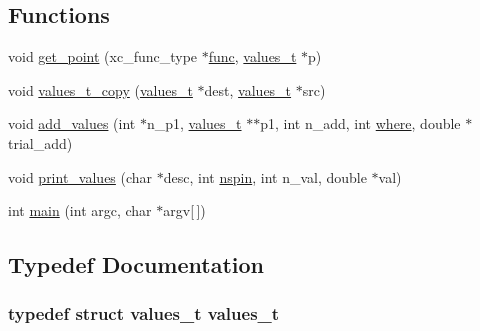 \subsection*{Functions}
\begin{DoxyCompactItemize}
\item 
void \hyperlink{xc-regression_8c_af0b756d219cc621ec493e3e0207295bd}{get\-\_\-point} (xc\-\_\-func\-\_\-type $\ast$\hyperlink{test_8c_a200d039021b3e9762ab6babd44bf5805}{func}, \hyperlink{structvalues__t}{values\-\_\-t} $\ast$p)
\item 
void \hyperlink{xc-regression_8c_abaaca43e77b5916482d352d1792aeb62}{values\-\_\-t\-\_\-copy} (\hyperlink{structvalues__t}{values\-\_\-t} $\ast$dest, \hyperlink{structvalues__t}{values\-\_\-t} $\ast$src)
\item 
void \hyperlink{xc-regression_8c_aad37c63766d9e3872e9e0fd079f8f2d8}{add\-\_\-values} (int $\ast$n\-\_\-p1, \hyperlink{structvalues__t}{values\-\_\-t} $\ast$$\ast$p1, int n\-\_\-add, int \hyperlink{macros_8h_a9ea237347839348e994103e6e7d8bab7}{where}, double $\ast$trial\-\_\-add)
\item 
void \hyperlink{xc-regression_8c_a91905469de04a523a10b9897e672fde2}{print\-\_\-values} (char $\ast$desc, int \hyperlink{xc-consistency_8c_a336d0e46bcbdfc54f68dd6f1b655f6c1}{nspin}, int n\-\_\-val, double $\ast$val)
\item 
int \hyperlink{xc-regression_8c_a0ddf1224851353fc92bfbff6f499fa97}{main} (int argc, char $\ast$argv\mbox{[}$\,$\mbox{]})
\end{DoxyCompactItemize}


\subsection{Typedef Documentation}
\hypertarget{xc-regression_8c_aae2ee2c76d89f2a35ccf2ee100e04df6}{
\subsubsection[{values\-\_\-t}]{\setlength{\rightskip}{0pt plus 5cm}typedef struct {\bf values\-\_\-t}  {\bf values\-\_\-t}}}\label{xc-regression_8c_aae2ee2c76d89f2a35ccf2ee100e04df6}


